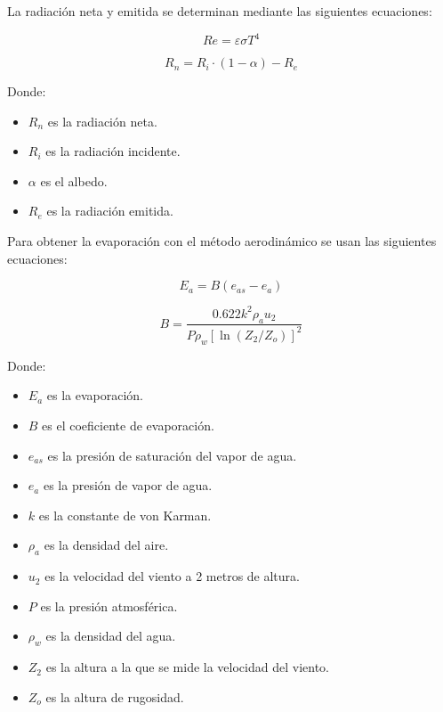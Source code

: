 \documentclass{article}  %
\begin{document}
La radiación neta y emitida se determinan mediante las siguientes ecuaciones:

\begin{equation}
  Re = \varepsilon \sigma T^4
\end{equation}

\begin{equation}
  R_n = R_i \cdot (1 - \alpha) - R_{e}
\end{equation}

Donde:

\begin{itemize}
  \item $R_n$ es la radiación neta.
  \item $R_i$ es la radiación incidente.
  \item $\alpha$ es el albedo.
  \item $R_e$ es la radiación emitida.
\end{itemize}

Para obtener la evaporación con el método aerodinámico se usan las siguientes ecuaciones:

\begin{equation}
  E_a = B(e_{as} - e_a)
\end{equation}
  
\begin{equation}
  B = \frac{0.622 k^2 \rho_a u_2}{P \rho_w [\ln(Z_2 / Z_o)]^2}
\end{equation}

Donde:

\begin{itemize}
  \item $E_a$ es la evaporación.
  \item $B$ es el coeficiente de evaporación.
  \item $e_{as}$ es la presión de saturación del vapor de agua.
  \item $e_a$ es la presión de vapor de agua.
  \item $k$ es la constante de von Karman.
  \item $\rho_a$ es la densidad del aire.
  \item $u_2$ es la velocidad del viento a 2 metros de altura.
  \item $P$ es la presión atmosférica.
  \item $\rho_w$ es la densidad del agua.
  \item $Z_2$ es la altura a la que se mide la velocidad del viento.
  \item $Z_o$ es la altura de rugosidad.
\end{itemize}
\end{document}
